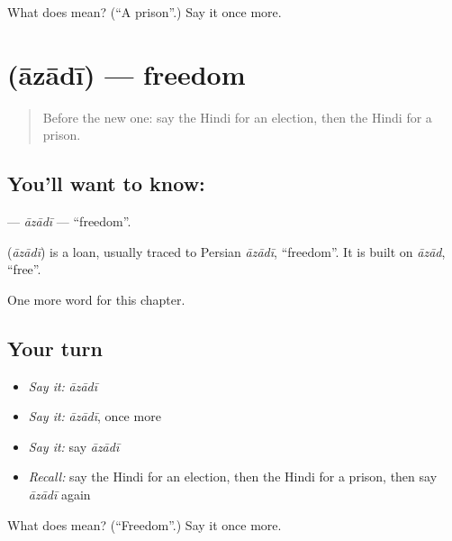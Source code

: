 \begin{tcolorbox}[breakable,colback=teal!4,colframe=teal!35!black,title={Before you move on}]
What does  mean? (\textquotedblleft{}A prison\textquotedblright{}.) Say it once more.
\end{tcolorbox}
\section[\texorpdfstring{\hi{आज़ादी} (āzādī)}{आज़ादी (āzādī)}]{ (āzādī) — freedom}

\label{lesson:HI-C219-azadi}



\begin{quote}
Before the new one: say the Hindi for an election, then the Hindi for a prison.
\end{quote}

\subsection*{You'll want to know: }
\textbf{} — \emph{āzādī} — \textquotedblleft{}freedom\textquotedblright{}.

\begin{cousinweb}
\textbf{} (\emph{āzādī}) is a loan, usually traced to Persian \emph{āzādī}, \textquotedblleft{}freedom\textquotedblright{}. It is built on \emph{āzād}, \textquotedblleft{}free\textquotedblright{}.
\end{cousinweb}

\begin{grammarlens}[title={What you've built}]
One more word for this chapter.
\end{grammarlens}

\subsection*{Your turn}
\begin{itemize}
\raggedright
  \item \emph{Say it:} \emph{āzādī}
  \item \emph{Say it:} \emph{āzādī}, once more
  \item \emph{Say it:} say \emph{āzādī}
  \item \emph{Recall:} say the Hindi for an election, then the Hindi for a prison, then say \emph{āzādī} again
\end{itemize}

\begin{tcolorbox}[breakable,colback=teal!4,colframe=teal!35!black,title={Before you move on}]
What does  mean? (\textquotedblleft{}Freedom\textquotedblright{}.) Say it once more.
\end{tcolorbox}
